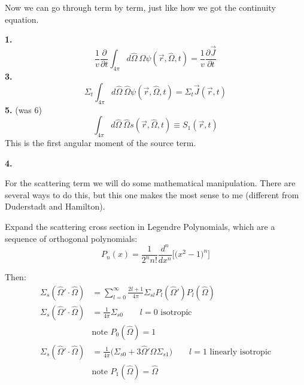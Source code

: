 \documentclass[12pt]{article}
\newcommand{\vOmega}{\ensuremath{\hat{\Omega}}}
\begin{document}
Now we can go through term by term, just like how we got the continuity equation.

\textbf{1.}
\begin{equation}
\frac{1}{v}\frac{\partial}{\partial t} \int_{4\pi} d\vOmega\: \vOmega \psi(\vec{r}, \vOmega, t) = \boxed{\frac{1}{v}\frac{\partial \vec{J}}{\partial t}}
\end{equation}
\textbf{3.} 
\begin{equation}
\Sigma_t \int_{4\pi} d\vOmega\: \vOmega \psi(\vec{r}, \vOmega, t) = \boxed{\Sigma_t  \vec{J}(\vec{r}, t)}
\end{equation}
\textbf{5.} (was 6)
\begin{equation}
\int_{4\pi} d\vOmega\: \vOmega s(\vec{r}, \vOmega, t) \equiv \boxed{S_{1}(\vec{r}, t)}
\end{equation}
This is the first angular moment of the source term. 

\textbf{4.} 


%
%

For the scattering term we will do some mathematical manipulation. There are several ways to do this, but this one makes the most sense to me (different from Duderstadt and Hamilton).

Expand the scattering cross section in Legendre Polynomials, which are a sequence of orthogonal polynomials:
%
\[P_n(x) = \frac{1}{2^n n!}\frac{d^n}{dx^n} \bigl[\bigl( x^2 -1 \bigr)^n\bigr] \]

Then:
\begin{align}
\Sigma_s(\vOmega' \cdot \vOmega) &= \sum_{l=0}^{\infty} \frac{2l+1}{4\pi} \Sigma_{sl} P_l(\vOmega')P_l(\vOmega) \\
%
\Sigma_s(\vOmega' \cdot \vOmega) &=  \frac{1}{4\pi}\Sigma_{s0} \qquad l=0 \text{ isotropic} \\
& \text{note } P_0 (\vOmega) = 1 \\
%
\Sigma_s(\vOmega' \cdot \vOmega) &=  \frac{1}{4\pi}\bigl( \Sigma_{s0} + 3\vOmega' \vOmega \Sigma_{s1} \bigr) \qquad l=1 \text{ linearly isotropic}\\
& \text{note } P_1 (\vOmega) = \vOmega 
\end{align}
\end{document}
